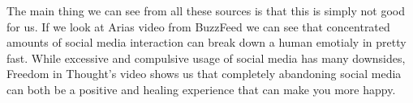 \documentclass[11pt]{article}
\begin{document}
The main thing we can see from all these sources is that this is simply not good for us.
If we look at Arias video from BuzzFeed we can see that concentrated amounts of social
media interaction can break down a human emotialy in pretty fast. While excessive and
compulsive usage of social media has many downsides, Freedom in Thought’s video shows
us that completely abandoning social media can both be a positive and healing experience
that can make you more happy.

\pagebreak


\end{document}
